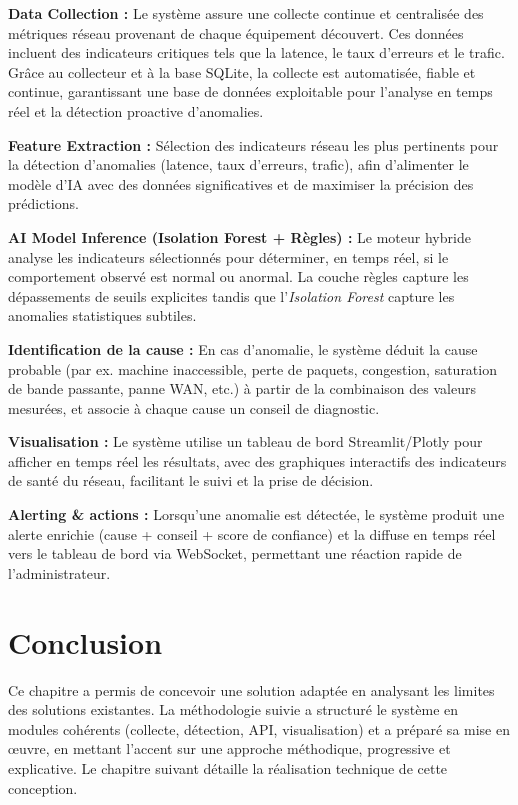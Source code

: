 \documentclass[12pt,a4paper]{report}
\begin{document}
\noindent\textbf{Data Collection :}
Le système assure une collecte continue et centralisée des métriques réseau
provenant de chaque équipement découvert. Ces données incluent des indicateurs
critiques tels que la latence, le taux d'erreurs et le trafic. Grâce au collecteur
et à la base SQLite, la collecte est automatisée, fiable et continue, garantissant
une base de données exploitable pour l'analyse en temps réel et la détection
proactive d'anomalies.

\noindent\textbf{Feature Extraction :}
Sélection des indicateurs réseau les plus pertinents pour la détection
d'anomalies (latence, taux d'erreurs, trafic), afin d'alimenter le modèle d'IA
avec des données significatives et de maximiser la précision des prédictions.

\noindent\textbf{AI Model Inference (Isolation Forest + Règles) :}
Le moteur hybride analyse les indicateurs sélectionnés pour déterminer, en temps
réel, si le comportement observé est normal ou anormal. La couche règles capture
les dépassements de seuils explicites tandis que l'\textit{Isolation Forest}
capture les anomalies statistiques subtiles.

\noindent\textbf{Identification de la cause :}
En cas d'anomalie, le système déduit la cause probable (par ex. machine
inaccessible, perte de paquets, congestion, saturation de bande passante, panne
WAN, etc.) à partir de la combinaison des valeurs mesurées, et associe à chaque
cause un conseil de diagnostic.

\noindent\textbf{Visualisation :}
Le système utilise un tableau de bord Streamlit/Plotly pour afficher en temps réel
les résultats, avec des graphiques interactifs des indicateurs de santé du réseau,
facilitant le suivi et la prise de décision.

\noindent\textbf{Alerting \& actions :}
Lorsqu'une anomalie est détectée, le système produit une alerte enrichie
(cause + conseil + score de confiance) et la diffuse en temps réel vers le tableau
de bord via WebSocket, permettant une réaction rapide de l'administrateur.

\section{Conclusion}
Ce chapitre a permis de concevoir une solution adaptée en analysant les limites
des solutions existantes. La méthodologie suivie a structuré le système en modules
cohérents (collecte, détection, API, visualisation) et a préparé sa mise en œuvre,
en mettant l'accent sur une approche méthodique, progressive et explicative. Le
chapitre suivant détaille la réalisation technique de cette conception.
\end{document}
